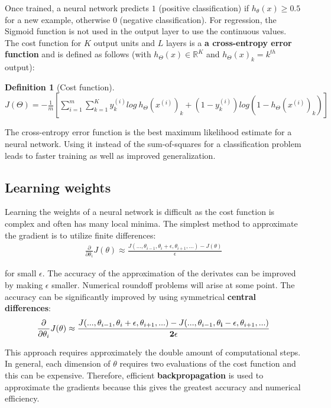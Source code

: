 \documentclass{report}
\newtheorem{definition}{Definition}[section]
\begin{document}
Once trained, a neural network predicts $1$ (positive classification) if $h_\theta(x) \ge 0.5$ for a new example, otherwise $0$ (negative classification).
For regression, the Sigmoid function is not used in the output layer to use the continuous values.
\\

The cost function for $K$ output units and $L$ layers is a {\bf a cross-entropy error function} and is defined as follows (with $h_\Theta(x) \in \mathbb{R}^K$ and $h_\Theta(x)_k = k^{th}$ output):

\begin{definition}[Cost function] ~\\
$J(\Theta) = -\frac{1}{m}[\sum_{i=1}^m \sum_{k=1}^K y_k^{(i)}log\:h_{\Theta}(x^{(i)})_k+(1-y_k^{(i)})log(1-h_{\Theta}(x^{(i)})_k)]$
\end{definition}


The cross-entropy error function is the best maximum likelihood estimate for a neural network.
Using it instead of the sum-of-squares for a classification problem leads to faster training as well as improved generalization.


\subsection{Learning weights}
\label{chapter:learningweights}
Learning the weights of a neural network is difficult as the cost function is complex and often has many local minima.
The simplest method to approximate the gradient is to utilize finite differences:
\begin{align*}
\frac{\partial}{\partial\theta_i}J(\theta)\approx\frac{J(...,\theta_{i-1},\theta_{i}+\epsilon,\theta_{i+1},...)-J(\theta)}{\epsilon}
\end{align*}

for small $\epsilon$. The accuracy of the approximation of the derivates can be improved by making $\epsilon$ smaller.
Numerical roundoff problems will arise at some point.
The accuracy can be significantly improved by using symmetrical {\bf central differences}:
\begin{align*}
\frac{\partial}{\partial\theta_i}J(\theta)\approx\frac{J(...,\theta_{i-1},\theta_{i}+\epsilon,\theta_{i+1},...)-J(...,\theta_{i-1},{\bf \theta_{i}-\epsilon},\theta_{i+1},...)}{{\bf 2}\epsilon}
\end{align*}

This approach requires approximately the double amount of computational steps.
In general, each dimension of $\theta$ requires two evaluations of the cost function and this can be expensive.
Therefore, efficient {\bf backpropagation} is used to approximate the gradients because this gives the greatest accuracy and numerical efficiency.
\end{document}
